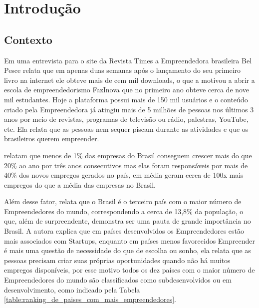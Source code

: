 \chapter{Introdução}
\label{cap-introducao}

\section{Contexto}
\label{section:contexto}

Em uma entrevista para o site da Revista Times a Empreendedora brasileira Bel Pesce relata que em apenas duas semanas após o lançamento do seu primeiro livro na internet ele obteve mais de cem mil downloads, o que a motivou a abrir a escola de empreendedorismo FazInova que no primeiro ano obteve cerca de nove mil estudantes. Hoje a plataforma possui mais de 150 mil usuários e o conteúdo criado pela Empreendedora já atingiu mais de 5 milhões de pessoas nos últimos 3 anos por meio de revistas, programas de televisão ou rádio, palestras, YouTube, etc. Ela relata que as pessoas nem sequer piscam durante as atividades e que os brasileiros querem empreender.

 relatam que menos de 1\% das empresas do Brasil conseguem crescer mais do que 20\% ao ano por três anos consecutivos mas elas foram responsáveis por mais de 40\% dos novos empregos gerados no país, em média geram cerca de 100x mais empregos do que a média das empresas no Brasil. 

Além desse fator,  relata que o Brasil é o terceiro país com o maior número de Empreendedores do mundo, correspondendo a cerca de 13,8\% da população, o que, além de surpreendente, demonstra ser uma pauta de grande importância no Brasil. A autora explica que em países desenvolvidos os Empreendedores estão mais associados com Startups, enquanto em países menos favorecidos Empreender é mais uma questão de necessidade do que de escolha ou sonho, ela relata que as pessoas precisam criar suas próprias oportunidades quando não há muitos empregos disponíveis, por esse motivo todos os dez países com o maior número de Empreendedores do mundo são classificados como subdesenvolvidos ou em desenvolvimento, como indicado pela Tabela \ref{table:ranking_de_paises_com_mais_empreendedores}.

